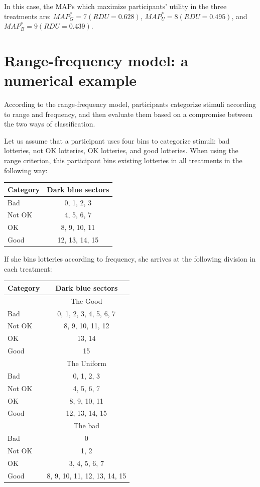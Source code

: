 In this case, the MAPs which maximize participants' utility in the three treatments are: $MAP^{*}_G = 7 (RDU = 0.628)$, $MAP^{*}_U = 8 (RDU = 0.495)$, and $MAP^{*}_B = 9 (RDU = 0.439)$.

\newpage
\section{Range-frequency model: a numerical example}
\label{section:appendixb}
\setcounter{figure}{0}
\setcounter{table}{0}
\renewcommand{\thefigure}{B.\arabic{figure}}
\renewcommand{\thetable}{B.\arabic{table}}
According to the range-frequency model, participants categorize stimuli according to range and frequency, and then evaluate them based on a compromise between the two ways of classification.

Let us assume that a participant uses four bins to categorize stimuli: bad lotteries, not OK lotteries, OK lotteries, and good lotteries.
When using the range criterion, this participant bins existing lotteries in all treatments in the following way:
\begin{center}
\begin{tabular}{p{3cm} c}
Category & Dark blue sectors \\
\hline
Bad & 0, 1, 2, 3\\
Not OK & 4, 5, 6, 7\\
OK & 8, 9, 10, 11\\
Good & 12, 13, 14, 15\\
\hline
\end{tabular}
\end{center}

If she bins lotteries according to frequency, she arrives at the following division in each treatment:
\begin{center}
\begin{tabular}{p{3cm} c}
Category & Dark blue sectors \\
\hline
& The Good \\
\cmidrule{2-2}
Bad & 0, 1, 2, 3, 4, 5, 6, 7\\
Not OK & 8, 9, 10, 11, 12\\
OK & 13, 14\\
Good & 15\\
\cmidrule{2-2}
& The Uniform \\
\cmidrule{2-2}
Bad & 0, 1, 2, 3\\
Not OK & 4, 5, 6, 7\\
OK & 8, 9, 10, 11\\
Good & 12, 13, 14, 15\\
\cmidrule{2-2}
& The bad \\
\cmidrule{2-2}
Bad & 0\\
Not OK & 1, 2\\
OK & 3, 4, 5, 6, 7\\
Good & 8, 9, 10, 11, 12, 13, 14, 15\\
\hline
\end{tabular}
\end{center}

